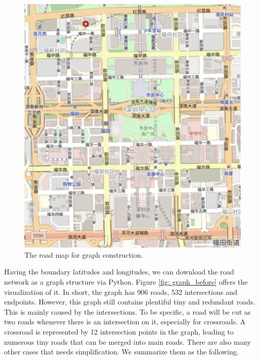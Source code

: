 \begin{figure}[htb]
  \centering
  \includegraphics[width=\textwidth]{images/roadmap.png}
  \caption{The road map for graph construction.}
  \label{fig: roadmap}
\end{figure}

Having the boundary latitudes and longitudes, we can download the road network as a graph structure via Python. Figure \ref{fig: graph_before} offers the visualization of it. In short, the graph has 906 roads, 532 intersections and endpoints. However, this graph still contains plentiful tiny and redundant roads. This is mainly caused by the intersections\cite{grah_simplify}. To be specific, a road will be cut as two roads whenever there is an intersection on it, especially for crossroads. A crossroad is represented by 12 intersection points in the graph, leading to numerous tiny roads that can be merged into main roads. There are also many other cases that needs simplification. We summarize them as the following.

